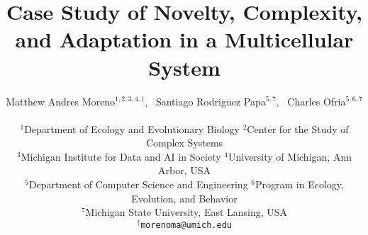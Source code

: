 
\title{Case Study of Novelty, Complexity, and Adaptation in a Multicellular System}
\author{
    Matthew Andres Moreno$^{1,2,3,4,\dagger}$,\ %
    Santiago Rodriguez Papa$^{5,7}$,\ %
    Charles Ofria$^{5,6,7}$ \\
    \mbox{}\\
    $^1$Department of Ecology and Evolutionary Biology
    $^2$Center for the Study of Complex Systems \\
    $^3$Michigan Institute for Data and AI in Society
    $^4$University of Michigan, Ann Arbor, USA \\
    $^5$Department of Computer Science and Engineering
    $^6$Program in Ecology, Evolution, and Behavior \\
    $^7$Michigan State University, East Lansing, USA \\
    $^\dagger$\texttt{morenoma@umich.edu}
}

\maketitle

%
%

